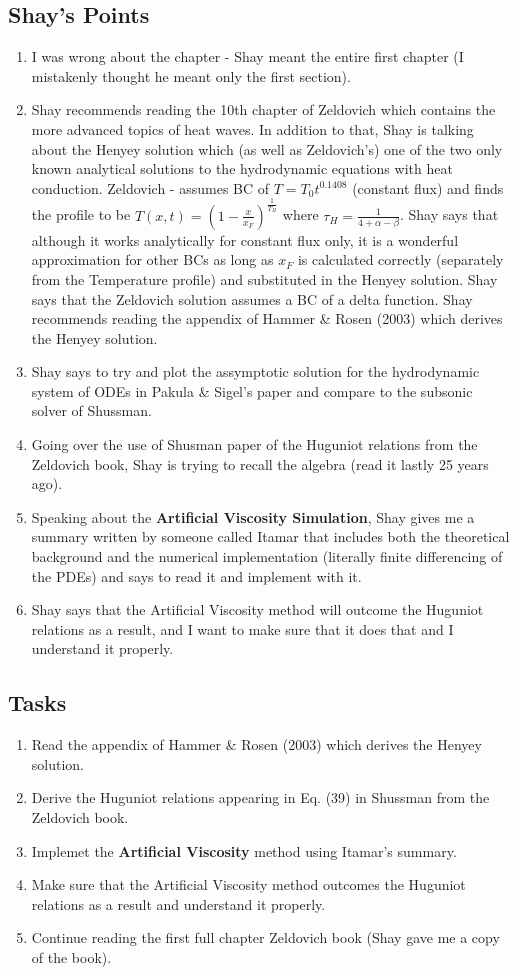 \documentclass[11pt]{article}
\begin{document}
\subsection{Shay's Points}
\begin{enumerate}
    \item I was wrong about the chapter - Shay meant the entire first chapter (I mistakenly thought he meant only the first section).
    \item Shay recommends reading the 10th chapter of Zeldovich which contains the more advanced topics of heat waves.
    In addition to that, Shay is talking about the Henyey solution which (as well as Zeldovich's) one of the two only known analytical solutions to the hydrodynamic equations with heat conduction.
    Zeldovich - assumes BC of $T=T_0 t^0.1408$ (constant flux) and finds the profile to be $T(x,t)=(1-\frac{x}{x_F})^{\frac{1}{T_H}}$ where $\tau_H = \frac{1}{4+\alpha-\beta}$. Shay says that although it works analytically for constant flux only, it is a wonderful approximation for other BCs as long as $x_F$ is calculated correctly (separately from the Temperature profile) and substituted in the Henyey solution.
    Shay says that the Zeldovich solution assumes a BC of a delta function.
    Shay recommends reading the appendix of Hammer \& Rosen (2003) which derives the Henyey solution.
    \item Shay says to try and plot the assymptotic solution for the hydrodynamic system of ODEs in Pakula \& Sigel's paper and compare to the subsonic solver of Shussman.
    \item Going over the use of Shusman paper of the Huguniot relations from the Zeldovich book, Shay is trying to recall the algebra (read it lastly 25 years ago).
    \item Speaking about the \textbf{Artificial Viscosity Simulation}, Shay gives me a summary written by someone called Itamar that includes both the theoretical background and the numerical implementation (literally finite differencing of the PDEs) and says to read it and implement with it.
    \item Shay says that the Artificial Viscosity method will outcome the Huguniot relations as a result, and I want to make sure that it does that and I understand it properly.
\end{enumerate}
    \subsection{Tasks}
\begin{enumerate}
    \item Read the appendix of Hammer \& Rosen (2003) which derives the Henyey solution.
    \item Derive the Huguniot relations appearing in Eq. (39) in Shussman from the Zeldovich book.
    \item Implemet the \textbf{Artificial Viscosity} method using Itamar's summary.
    \item Make sure that the Artificial Viscosity method outcomes the Huguniot relations as a result and understand it properly.
    \item Continue reading the first full chapter Zeldovich book (Shay gave me a copy of the book).
\end{enumerate}
\end{document}
